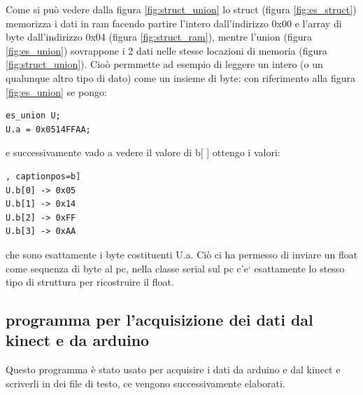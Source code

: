 \documentclass[10pt,a4paper]{article}
\begin{document}
Come si pu\`o vedere dalla figura \ref{fig:struct_union} lo struct (figura \ref{fig:es_struct}) memorizza i dati in ram facendo partire l'intero dall'indirizzo 0x00 e l'array di byte dall'indirizzo 0x04 (figura \ref{fig:struct_ram}), mentre l'union (figura \ref{fig:es_union}) sovrappone i 2 dati nelle stesse locazioni di memoria (figura \ref{fig:struct_union}).
Cio\`o permmette ad esempio di leggere un intero (o un qualunque altro tipo di dato) come un insieme di byte: con riferimento alla figura \ref{fig:es_union} se pongo:
\begin{lstlisting}[style=myArduino, caption=classe "serial", captionpos=b]
es_union U;
U.a = 0x0514FFAA;
\end{lstlisting}
e successivamente vado a vedere il valore di b[ ] ottengo i valori:
\begin{lstlisting}[style=myoutput, caption=print dei valori di b[ ], captionpos=b]
U.b[0] -> 0x05
U.b[1] -> 0x14
U.b[2] -> 0xFF
U.b[3] -> 0xAA
\end{lstlisting}
che sono esattamente i byte costituenti U.a. Ci\`o ci ha permesso di inviare un float come sequenza di byte al pc, nella classe serial sul pc c'e` esattamente lo stesso tipo di struttura per ricostruire il float. 

\subsection{programma per l'acquisizione dei dati dal kinect e da arduino}
Questo programma \`e stato usato per acquisire i dati da arduino e dal kinect e scriverli in dei file di testo, ce vengono successivamente elaborati. 
%
%
\end{document}

